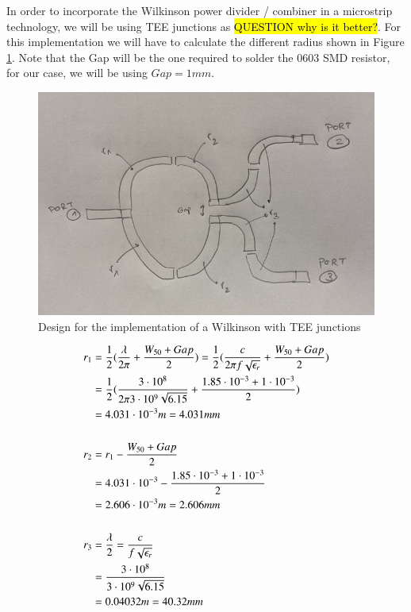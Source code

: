 \documentclass[12pt]{report} %
\newcommand{\question}[1]{\sethlcolor{red}\hl{QUESTION #1}}
\begin{document}
In order to incorporate the Wilkinson power divider / combiner in a microstrip technology, we will be using TEE junctions as \question{why is it better?}. For this implementation we will have to calculate the different radius shown in Figure \ref{fig:microstrip_elements:wilkinson_tee_design}. Note that the Gap will be the one required to solder the 0603 SMD resistor, for our case, we will be using $Gap = 1 mm$.

\begin{figure}
    \centering
    \includegraphics[width=1\linewidth]{images//microstrip_elements/wilkinson_tee_design.png}
    \caption{Design for the implementation of a Wilkinson with TEE junctions}
    \label{fig:microstrip_elements:wilkinson_tee_design}
\end{figure}

\begin{align*}
    r_1 &= \frac{1}{2} \* (\frac{\lambda}{2 \* \pi} + \frac{W_{50} + Gap}{2})  = \frac{1}{2} \* (\frac{c}{2 \* \pi \* f \* \sqrt{\epsilon_r}} + \frac{W_{50} + Gap}{2})  \\
    &= \frac{1}{2} \* (\frac{3 \cdot 10^8}{2 \* \pi \* 3 \cdot 10^9 \* \sqrt{6.15}} + \frac{1.85 \cdot 10^{-3} + 1 \cdot 10^{-3}}{2})  \\
    &= 4.031 \cdot 10^{-3} m = 4.031 mm \\
    \\
    r_2 &= r_1 - \frac{W_{50} + Gap}{2}  \\
    &= 4.031 \cdot 10^{-3} - \frac{1.85 \cdot 10^{-3} + 1 \cdot 10^{-3}}{2}  \\
    &= 2.606 \cdot 10^{-3} m = 2.606 mm \\
    \\
    r_3 &= \frac{\lambda}{2} = \frac{c}{f \* \sqrt{\epsilon_r}} \\
    &= \frac{3 \cdot 10^8}{3 \cdot 10^9 \* \sqrt{6.15}} \\
    &= 0.04032 m = 40.32 mm \\
\end{align*}
\end{document}
